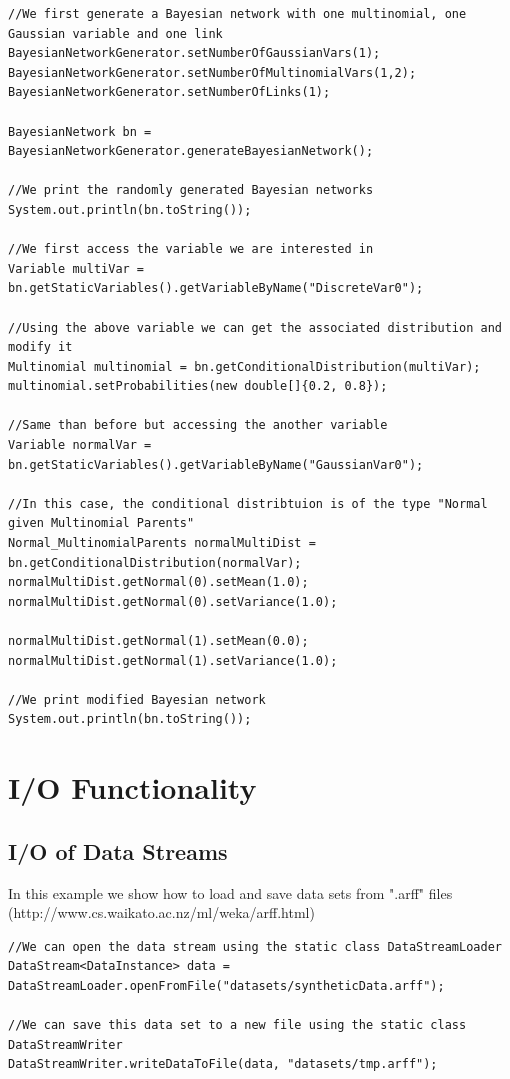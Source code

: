 \begin{lstlisting}
//We first generate a Bayesian network with one multinomial, one Gaussian variable and one link
BayesianNetworkGenerator.setNumberOfGaussianVars(1);
BayesianNetworkGenerator.setNumberOfMultinomialVars(1,2);
BayesianNetworkGenerator.setNumberOfLinks(1);

BayesianNetwork bn = BayesianNetworkGenerator.generateBayesianNetwork();

//We print the randomly generated Bayesian networks
System.out.println(bn.toString());

//We first access the variable we are interested in
Variable multiVar = bn.getStaticVariables().getVariableByName("DiscreteVar0");

//Using the above variable we can get the associated distribution and modify it
Multinomial multinomial = bn.getConditionalDistribution(multiVar);
multinomial.setProbabilities(new double[]{0.2, 0.8});

//Same than before but accessing the another variable
Variable normalVar = bn.getStaticVariables().getVariableByName("GaussianVar0");

//In this case, the conditional distribtuion is of the type "Normal given Multinomial Parents"
Normal_MultinomialParents normalMultiDist = bn.getConditionalDistribution(normalVar);
normalMultiDist.getNormal(0).setMean(1.0);
normalMultiDist.getNormal(0).setVariance(1.0);

normalMultiDist.getNormal(1).setMean(0.0);
normalMultiDist.getNormal(1).setVariance(1.0);

//We print modified Bayesian network
System.out.println(bn.toString());

\end{lstlisting}


\section{I/O Functionality}

\subsection{I/O of Data Streams}

In this example we show how to load and save data sets from ".arff" files (http://www.cs.waikato.ac.nz/ml/weka/arff.html)

\begin{lstlisting}
//We can open the data stream using the static class DataStreamLoader
DataStream<DataInstance> data = DataStreamLoader.openFromFile("datasets/syntheticData.arff");

//We can save this data set to a new file using the static class DataStreamWriter
DataStreamWriter.writeDataToFile(data, "datasets/tmp.arff");
\end{lstlisting}

